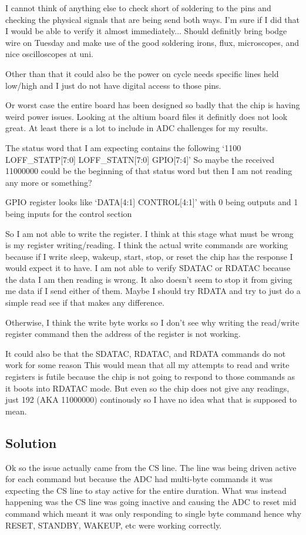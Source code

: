 I cannot think of anything else to check short of soldering to the pins and checking
the physical signals that are being send both ways. I'm sure if I did that I would be able
to verify it almost immediately... Should definitly bring bodge wire on Tuesday and make
use of the good soldering irons, flux, microscopes, and nice oscilloscopes at uni.

Other than that it could also be the power on cycle needs specific lines held low/high
and I just do not have digital access to those pins.

Or worst case the entire board has been designed so badly that the chip is having weird
power issues. Looking at the altium board files it definitly does not look great.
At least there is a lot to include in ADC challenges for my results.


The status word that I am expecting contains the following
`1100 LOFF\_STATP[7:0] LOFF\_STATN[7:0] GPIO[7:4]'
So maybe the received 11000000 could be the beginning of that status word but then I
am not reading any more or something?

GPIO register looks like `DATA[4:1] CONTROL[4:1]' with 0 being outputs and 1 being inputs
for the control section

So I am not able to write the register. I think at this stage what must be wrong is my
register writing/reading.
I think the actual write commands are working
because if I write sleep, wakeup, start, stop, or reset
the chip has the response I would expect it to have.
I am not able to verify SDATAC or RDATAC because the data I am then reading is wrong.
It also doesn't seem to stop it from giving me data if I send either of them.
Maybe I should try RDATA and try to just do a simple read see if that makes any difference.

Otherwise, I think the write byte works so I don't see why writing the read/write register
command then the address of the register is not working.

It could also be that the SDATAC, RDATAC, and RDATA commands do not work for some reason
This would mean that all my attempts to read and write registers is futile because
the chip is not going to respond to those commands as it boots into RDATAC mode.
But even so the chip does not give any readings, just 192 (AKA 11000000) continously
so I have no idea what that is supposed to mean.


\subsection{Solution}
Ok so the issue actually came from the CS line. The line was being driven active for each
command but because the ADC had multi-byte commands it was expecting the CS line to stay
active for the entire duration.
What was instead happening was the CS line was going inactive
and causing the ADC to reset mid command which meant it was only responding to single byte
command hence why RESET, STANDBY, WAKEUP, etc were working correctly.

